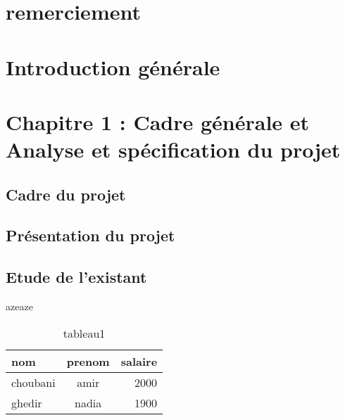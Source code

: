 \documentclass{article}
\renewcommand{\listtablename}{liste des tableaux}
\begin{document}

\section*{remerciement}
\lipsum[1]
\cleardoublepage
\tableofcontents
\cleardoublepage
\listoffigures
\cleardoublepage
\listoftables
\renewcommand{\listtablename}{liste des tableaux}
\cleardoublepage



\cleardoublepage

\setcounter{page}{1}

\section{Introduction générale}
\lipsum[1]	
\newpage
\section{Chapitre 1 : Cadre générale et Analyse et spécification du projet}
\lipsum[1]

\subsection{Cadre du projet}
\lipsum[1]
\subsection{Présentation du projet}
\lipsum[1]

\subsection{Etude de l’existant}
\lipsum[1] 
azeaze\cite{amir}
\begin{table}[H]
\centering
\label{tab:tab1} 


\caption[ceci1]{tableau1} 


\begin{tabular}{|l| c| r|}
\hline
\bfseries{ nom} &\bfseries{ prenom} &\bfseries{ salaire} \\ \hline
choubani& amir &2000\\
ghedir & nadia & 1900\\
\hline


\end{tabular}
\end{table}
\end{document}
